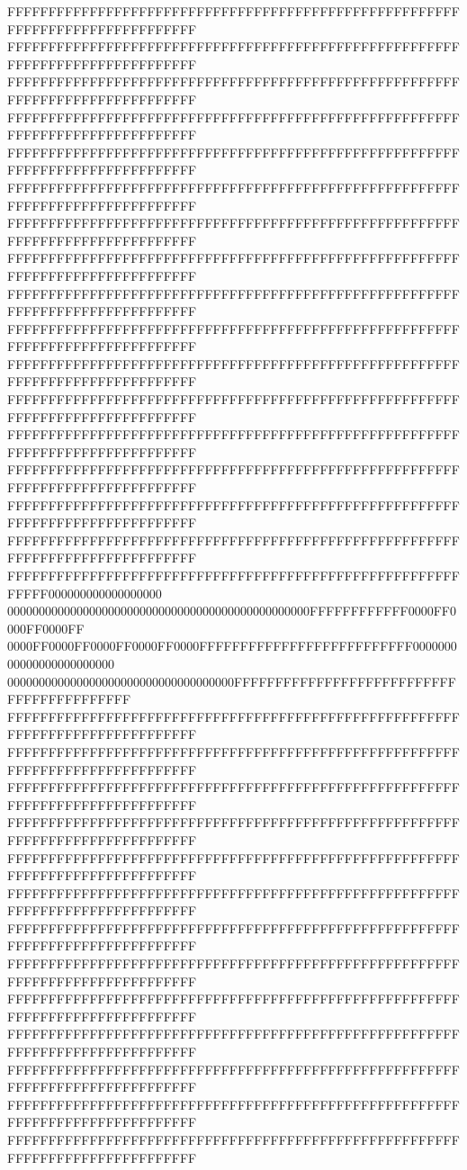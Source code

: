 FFFFFFFFFFFFFFFFFFFFFFFFFFFFFFFFFFFFFFFFFFFFFFFFFFFFFFFFFFFFFFFFFFFFFFFFFFFFFF
FFFFFFFFFFFFFFFFFFFFFFFFFFFFFFFFFFFFFFFFFFFFFFFFFFFFFFFFFFFFFFFFFFFFFFFFFFFFFF
FFFFFFFFFFFFFFFFFFFFFFFFFFFFFFFFFFFFFFFFFFFFFFFFFFFFFFFFFFFFFFFFFFFFFFFFFFFFFF
FFFFFFFFFFFFFFFFFFFFFFFFFFFFFFFFFFFFFFFFFFFFFFFFFFFFFFFFFFFFFFFFFFFFFFFFFFFFFF
FFFFFFFFFFFFFFFFFFFFFFFFFFFFFFFFFFFFFFFFFFFFFFFFFFFFFFFFFFFFFFFFFFFFFFFFFFFFFF
FFFFFFFFFFFFFFFFFFFFFFFFFFFFFFFFFFFFFFFFFFFFFFFFFFFFFFFFFFFFFFFFFFFFFFFFFFFFFF
FFFFFFFFFFFFFFFFFFFFFFFFFFFFFFFFFFFFFFFFFFFFFFFFFFFFFFFFFFFFFFFFFFFFFFFFFFFFFF
FFFFFFFFFFFFFFFFFFFFFFFFFFFFFFFFFFFFFFFFFFFFFFFFFFFFFFFFFFFFFFFFFFFFFFFFFFFFFF
FFFFFFFFFFFFFFFFFFFFFFFFFFFFFFFFFFFFFFFFFFFFFFFFFFFFFFFFFFFFFFFFFFFFFFFFFFFFFF
FFFFFFFFFFFFFFFFFFFFFFFFFFFFFFFFFFFFFFFFFFFFFFFFFFFFFFFFFFFFFFFFFFFFFFFFFFFFFF
FFFFFFFFFFFFFFFFFFFFFFFFFFFFFFFFFFFFFFFFFFFFFFFFFFFFFFFFFFFFFFFFFFFFFFFFFFFFFF
FFFFFFFFFFFFFFFFFFFFFFFFFFFFFFFFFFFFFFFFFFFFFFFFFFFFFFFFFFFFFFFFFFFFFFFFFFFFFF
FFFFFFFFFFFFFFFFFFFFFFFFFFFFFFFFFFFFFFFFFFFFFFFFFFFFFFFFFFFFFFFFFFFFFFFFFFFFFF
FFFFFFFFFFFFFFFFFFFFFFFFFFFFFFFFFFFFFFFFFFFFFFFFFFFFFFFFFFFFFFFFFFFFFFFFFFFFFF
FFFFFFFFFFFFFFFFFFFFFFFFFFFFFFFFFFFFFFFFFFFFFFFFFFFFFFFFFFFFFFFFFFFFFFFFFFFFFF
FFFFFFFFFFFFFFFFFFFFFFFFFFFFFFFFFFFFFFFFFFFFFFFFFFFFFFFFFFFFFFFFFFFFFFFFFFFFFF
FFFFFFFFFFFFFFFFFFFFFFFFFFFFFFFFFFFFFFFFFFFFFFFFFFFFFFFFFFFF000000000000000000
000000000000000000000000000000000000000000000000FFFFFFFFFFFF0000FF0000FF0000FF
0000FF0000FF0000FF0000FF0000FFFFFFFFFFFFFFFFFFFFFFFFFF000000000000000000000000
000000000000000000000000000000000000FFFFFFFFFFFFFFFFFFFFFFFFFFFFFFFFFFFFFFFFFF
FFFFFFFFFFFFFFFFFFFFFFFFFFFFFFFFFFFFFFFFFFFFFFFFFFFFFFFFFFFFFFFFFFFFFFFFFFFFFF
FFFFFFFFFFFFFFFFFFFFFFFFFFFFFFFFFFFFFFFFFFFFFFFFFFFFFFFFFFFFFFFFFFFFFFFFFFFFFF
FFFFFFFFFFFFFFFFFFFFFFFFFFFFFFFFFFFFFFFFFFFFFFFFFFFFFFFFFFFFFFFFFFFFFFFFFFFFFF
FFFFFFFFFFFFFFFFFFFFFFFFFFFFFFFFFFFFFFFFFFFFFFFFFFFFFFFFFFFFFFFFFFFFFFFFFFFFFF
FFFFFFFFFFFFFFFFFFFFFFFFFFFFFFFFFFFFFFFFFFFFFFFFFFFFFFFFFFFFFFFFFFFFFFFFFFFFFF
FFFFFFFFFFFFFFFFFFFFFFFFFFFFFFFFFFFFFFFFFFFFFFFFFFFFFFFFFFFFFFFFFFFFFFFFFFFFFF
FFFFFFFFFFFFFFFFFFFFFFFFFFFFFFFFFFFFFFFFFFFFFFFFFFFFFFFFFFFFFFFFFFFFFFFFFFFFFF
FFFFFFFFFFFFFFFFFFFFFFFFFFFFFFFFFFFFFFFFFFFFFFFFFFFFFFFFFFFFFFFFFFFFFFFFFFFFFF
FFFFFFFFFFFFFFFFFFFFFFFFFFFFFFFFFFFFFFFFFFFFFFFFFFFFFFFFFFFFFFFFFFFFFFFFFFFFFF
FFFFFFFFFFFFFFFFFFFFFFFFFFFFFFFFFFFFFFFFFFFFFFFFFFFFFFFFFFFFFFFFFFFFFFFFFFFFFF
FFFFFFFFFFFFFFFFFFFFFFFFFFFFFFFFFFFFFFFFFFFFFFFFFFFFFFFFFFFFFFFFFFFFFFFFFFFFFF
FFFFFFFFFFFFFFFFFFFFFFFFFFFFFFFFFFFFFFFFFFFFFFFFFFFFFFFFFFFFFFFFFFFFFFFFFFFFFF
FFFFFFFFFFFFFFFFFFFFFFFFFFFFFFFFFFFFFFFFFFFFFFFFFFFFFFFFFFFFFFFFFFFFFFFFFFFFFF
